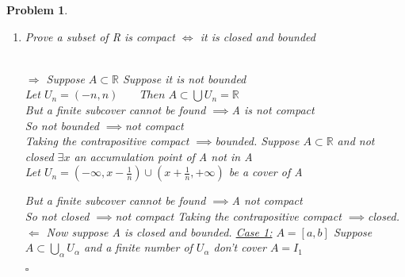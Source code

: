 \documentclass[a4paper]{article}
\newtheorem{prob}{\large{\large{Problem}}}
\newenvironment{sol}{\noindent{\large{\bf Solution:}}}{\hfill\ensuremath{\square}}
\def\bR{\mathbb R}
\def\imp{\ensuremath{\implies}}
\def\nl{\newline}
\begin{document}
\begin{prob}
{\begin{enumerate}[(a.)]
\item Prove a subset of R is compact $\iff$ it is closed and bounded
\nl\begin{sol}
\large{\\ $\Rightarrow$
\nl Suppose $A\subset \bR$ Suppose it is not bounded\\
Let $U_n=(-n,n) \qquad Then\; A\subset \bigcup U_n=\bR$\\
But a finite subcover cannot be found \imp A is not compact\\
So not bounded \imp not compact\\
\nl Taking the contrapositive
compact \imp bounded.
\nl Suppose $A\subset \bR$ and not closed
$\exists x$ an accumulation point of A not in A\\
\nl Let $U_n=(-\infty,x-\frac{1}{n})\cup(x+\frac{1}{n},+\infty)$ be a cover of A
\begin{center}
\end{center}
But a finite subcover cannot be found \imp A not compact\\
So not closed \imp not compact
\nl Taking the contrapositive
compact \imp closed.
\nl $\Leftarrow$
\nl Now suppose A is closed and bounded.
\nl \underline{Case 1:} $A=[a,b]$
\nl Suppose $A\subset \bigcup\limits_\alpha U_\alpha$ and a finite number of $U_\alpha$ don't cover $A=I_1$
\begin{center}
\end{center}}
\end{sol}
\end{enumerate}}
\end{prob}
\end{document}
